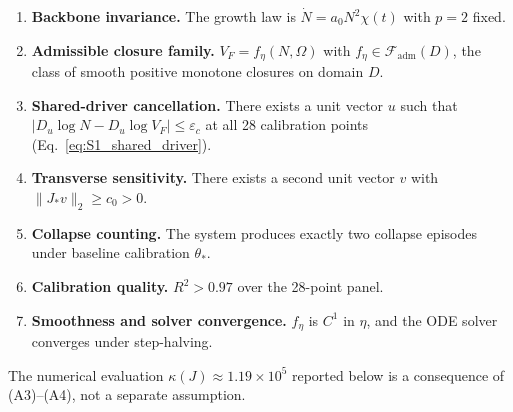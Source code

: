 \documentclass[11pt]{article}
\begin{document}
\begin{enumerate}[label=\textbf{(A\arabic*)},leftmargin=2.5em]
\item \textbf{Backbone invariance.} The growth law is $\dot{N}=a_0 N^2 \chi(t)$ with $p=2$ fixed.
\item \textbf{Admissible closure family.} $V_F = f_\eta(N,\Omega)$ with $f_\eta \in \mathcal{F}_{\mathrm{adm}}(D)$, the class of smooth positive monotone closures on domain $D$.
\item \textbf{Shared-driver cancellation.} There exists a unit vector $u$ such that $|D_u \log N - D_u \log V_F| \le \varepsilon_c$ at all 28 calibration points (Eq.~\eqref{eq:S1_shared_driver}).
\item \textbf{Transverse sensitivity.} There exists a second unit vector $v$ with $\|J_* v\|_2 \ge c_0 > 0$.
\item \textbf{Collapse counting.} The system produces exactly two collapse episodes under baseline calibration $\theta_*$.
\item \textbf{Calibration quality.} $R^2 > 0.97$ over the 28-point panel.
\item \textbf{Smoothness and solver convergence.} $f_\eta$ is $C^1$ in $\eta$, and the ODE solver converges under step-halving.
\end{enumerate}

\noindent The numerical evaluation $\kappa(J) \approx 1.19 \times 10^5$ reported below is a consequence of (A3)--(A4), not a separate assumption.
\end{document}
